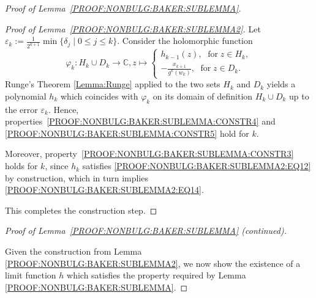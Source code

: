 \documentclass[a4paper, 12pt, twoside]{amsart}
\theoremstyle{definition}
\numberwithin{equation}{section}
\newcommand{\C}{{\mathbb C}}
\renewcommand{\phi}{\varphi}
\begin{document}
\begin{proof}[Proof of Lemma~\ref{PROOF:NONBULG:BAKER:SUBLEMMA}]
\begin{proof}[Proof of Lemma~\ref{PROOF:NONBULG:BAKER:SUBLEMMA2}]
            Let $\varepsilon_{k} := \frac{1}{2^{k+1}}\min\{\delta_j\mid 0 \leq j \leq k\}$.
            Consider the holomorphic function
            \begin{equation}\label{PROOF:NONBULG:BAKER:DEFPHI}
                \phi_{k} : H_{k} \cup D_{k} \to \C, z \mapsto \begin{cases}
                    h_{k-1}(z),\;\text{ for}\; z\in H_{k},\\
                    -\frac{x_{k+1}}{g^{k}(w_{k})},\;\text{ for}\;z \in D_{k}.
                \end{cases}
            \end{equation}
            Runge's Theorem \ref{Lemma:Runge} applied to the two sets $H_k$ and $D_k$ yields a polynomial $h_{k}$ which coincides with $\phi_{k}$ on its domain of definition $H_{k} \cup D_{k}$ up to the error $\varepsilon_{k}$. Hence, properties~\eqref{PROOF:NONBULG:BAKER:SUBLEMMA:CONSTR4} and \eqref{PROOF:NONBULG:BAKER:SUBLEMMA:CONSTR5} hold for $k$. 
            
            Moreover, property~\eqref{PROOF:NONBULG:BAKER:SUBLEMMA:CONSTR3} holds for $k$, since $h_k$ satisfies \eqref{PROOF:NONBULG:BAKER:SUBLEMMA2:EQ12} by construction, which in turn implies \eqref{PROOF:NONBULG:BAKER:SUBLEMMA2:EQ14}.  

            This completes the construction step.
        \end{proof}

\noindent\textit{Proof of Lemma~\ref{PROOF:NONBULG:BAKER:SUBLEMMA} (continued).}

        Given the construction from Lemma \ref{PROOF:NONBULG:BAKER:SUBLEMMA2}, we now show the existence of a limit function $h$ which satisfies the property required by Lemma \ref{PROOF:NONBULG:BAKER:SUBLEMMA}.


\end{proof}
\end{document}
